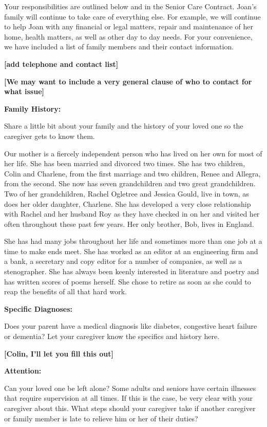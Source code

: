 \documentclass[]{article}
\begin{document}
Your responsibilities are outlined below and in the Senior Care
Contract. Joan's family will continue to take care of everything else.
For example, we will continue to help Joan with any financial or legal
matters, repair and maintenance of her home, health matters, as well as
other day to day needs. For your convenience, we have included a list of
family members and their contact information.

\textbf{{[}add telephone and contact list{]}}

\textbf{{[}We may want to include a very general clause of who to
contact for what issue{]}}

\textbf{Family History:}

Share a little bit about your family and the history of your loved one
so the caregiver gets to know them.

Our mother is a fiercely independent person who has lived on her own for
most of her life. She has been married and divorced two times. She has
two children, Colin and Charlene, from the first marriage and two
children, Renee and Allegra, from the second. She now has seven
grandchildren and two great grandchildren. Two of her grandchildren,
Rachel Ogletree and Jessica Gould, live in town, as does her older
daughter, Charlene. She has developed a very close relationship with
Rachel and her husband Roy as they have checked in on her and visited
her often throughout these past few years. Her only brother, Bob, lives
in England.

She has had many jobs throughout her life and sometimes more than one
job at a time to make ends meet. She has worked as an editor at an
engineering firm and a bank, a secretary and copy editor for a number of
companies, as well as a stenographer. She has always been keenly
interested in literature and poetry and has written scores of poems
herself. She chose to retire as soon as she could to reap the benefits
of all that hard work.

\textbf{Specific Diagnoses:}

Does your parent have a medical diagnosis like diabetes, congestive
heart failure or dementia? Let your caregiver know the specifics and
history here.

\textbf{{[}Colin, I'll let you fill this out{]}}

\textbf{Attention:}

Can your loved one be left alone? Some adults and seniors have certain
illnesses that require supervision at all times. If this is the case, be
very clear with your caregiver about this. What steps should your
caregiver take if another caregiver or family member is late to relieve
him or her of their duties?
\end{document}
